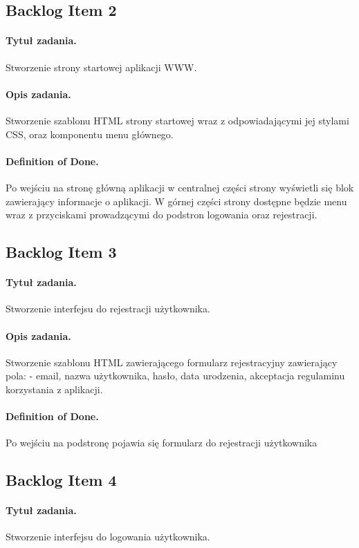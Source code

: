 \documentclass[a4paper]{article}
\begin{document}
\subsection{Backlog Item 2}
\paragraph{Tytuł zadania.} Stworzenie strony startowej aplikacji WWW.
\paragraph{Opis zadania.} Stworzenie szablonu HTML strony startowej wraz z odpowiadającymi jej stylami CSS, oraz komponentu menu głównego.
\paragraph{Definition of Done.} Po wejściu na stronę główną aplikacji w centralnej części strony wyświetli się blok zawierający
informacje o aplikacji. W górnej części strony dostępne będzie menu wraz z przyciskami prowadzącymi do podstron logowania oraz rejestracji.

\subsection{Backlog Item 3} 
\paragraph{Tytuł zadania.} Stworzenie interfejsu do rejestracji użytkownika.
\paragraph{Opis zadania.} Stworzenie szablonu HTML zawierającego formularz rejestracyjny zawierający pola: 
- email, nazwa użytkownika, hasło, data urodzenia, akceptacja regulaminu korzystania z aplikacji.
\paragraph{Definition of Done.} Po wejściu na podstronę pojawia się formularz do rejestracji użytkownika

 
\subsection{Backlog Item 4} 
\paragraph{Tytuł zadania.} Stworzenie interfejsu do logowania użytkownika.
\end{document}
